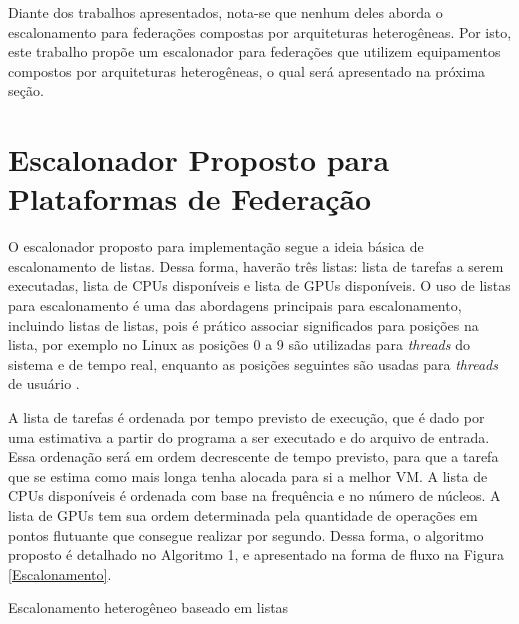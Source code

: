 Diante dos trabalhos apresentados, nota-se que nenhum deles aborda o escalonamento para federações compostas por arquiteturas heterogêneas. Por isto, este trabalho propõe um escalonador para federações que utilizem equipamentos compostos por arquiteturas heterogêneas, o qual será apresentado na próxima seção.

\section{Escalonador Proposto para Plataformas de Federação}

O escalonador proposto para implementação segue a ideia básica de escalonamento de listas. Dessa forma, haverão três listas: lista de tarefas a serem executadas, lista de \acrshort{CPU}s disponíveis e lista de \acrshort{GPU}s disponíveis. O uso de listas para escalonamento é uma das abordagens principais para escalonamento, incluindo listas de listas\cite{MultilevelFQ}, pois é prático associar significados para posições na lista, por exemplo no Linux as posições 0 a 9 são utilizadas para \textit{threads} do sistema e de tempo real, enquanto as posições seguintes são usadas para \textit{threads} de usuário \cite{KernelsComp}.

A lista de tarefas é ordenada por tempo previsto de execução, que é dado por uma estimativa a partir do programa a ser executado e do arquivo de entrada. Essa ordenação será em ordem decrescente de tempo previsto, para que a tarefa que se estima como mais longa tenha alocada para si a melhor \acrshort{VM}. A lista de \acrshort{CPU}s disponíveis é ordenada com base na frequência e no número de núcleos. A lista de \acrshort{GPU}s tem sua ordem determinada pela quantidade de operações em pontos flutuante que consegue realizar por segundo. Dessa forma, o algoritmo proposto é detalhado no Algoritmo 1, e apresentado na forma de fluxo na Figura \ref{Escalonamento}.

\begin{algorithm}
\caption{Escalonamento heterogêneo baseado em listas}
\begin{algorithmic}
			\Else
			\EndIf
		\Else
		\EndIf
	\EndWhile
\EndProcedure
\end{algorithmic}
\end{algorithm}

